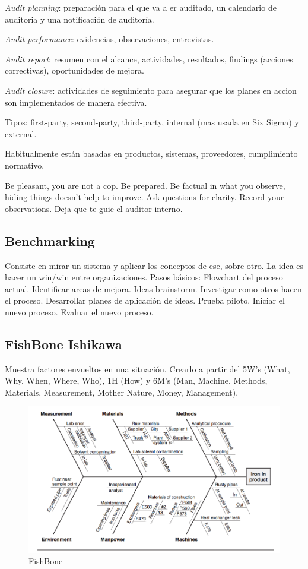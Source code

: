 \documentclass[]{article}
\begin{document}
\textit{Audit planning}: preparación para el que va a er auditado, un calendario de auditoria y una notificación de auditoría.

\textit{Audit performance}: evidencias, observaciones, entrevistas.

\textit{Audit report}: resumen con el alcance, actividades, resultados, findings (acciones correctivas), oportunidades de mejora.

\textit{Audit closure}: actividades de seguimiento para asegurar que los planes en accion son implementados de manera efectiva.

Tipos: first-party, second-party, third-party, internal (mas usada en Six Sigma) y external.

Habitualmente están basadas en productos, sistemas, proveedores, cumplimiento normativo.

Be pleasant, you are not a cop. Be prepared. Be factual in what you observe, hiding things doesn't help to improve. Ask questions for clarity. Record your observations. Deja que te guie el auditor interno.

\subsection{Benchmarking}

Consiste en mirar un sistema y aplicar los conceptos de ese, sobre otro. La idea es hacer un win/win entre organizaciones. Pasos básicos: Flowchart del proceso actual. Identificar areas de mejora. Ideas brainstorm. Investigar como otros hacen el proceso. Desarrollar planes de aplicación de ideas. Prueba piloto. Iniciar el nuevo proceso. Evaluar el nuevo proceso.

\subsection{FishBone Ishikawa}

Muestra factores envueltos en una situación. Crearlo a partir del 5W's (What, Why, When, Where, Who), 1H (How) y 6M's (Man, Machine, Methods, Materials, Measurement, Mother Nature, Money, Management).

\begin{figure}[ht!]
	\centering
	\includegraphics[width=120mm]{imagenes/FishBone.png}
	\caption{FishBone}
	\label{fig:FishBone}
\end{figure}
\end{document}

